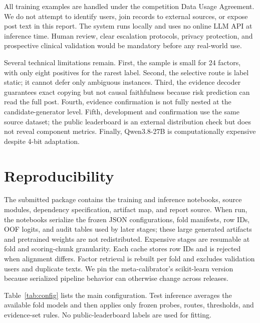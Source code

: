 \documentclass[conference]{IEEEtran}
\begin{document}
All training examples are handled under the competition Data Usage Agreement. We do not attempt to identify users, join records to external sources, or expose post text in this report. The system runs locally and uses no online LLM API at inference time. Human review, clear escalation protocols, privacy protection, and prospective clinical validation would be mandatory before any real-world use.

Several technical limitations remain. First, the sample is small for 24 factors, with only eight positives for the rarest label. Second, the selective route is label static; it cannot defer only ambiguous instances. Third, the evidence decoder guarantees exact copying but not causal faithfulness because risk prediction can read the full post. Fourth, evidence confirmation is not fully nested at the candidate-generator level. Fifth, development and confirmation use the same source dataset; the public leaderboard is an external distribution check but does not reveal component metrics. Finally, Qwen3.8-27B is computationally expensive despite 4-bit adaptation.

\section{Reproducibility}
The submitted package contains the training and inference notebooks, source modules, dependency specification, artifact map, and report source. When run, the notebooks serialize the frozen JSON configurations, fold manifests, row IDs, OOF logits, and audit tables used by later stages; these large generated artifacts and pretrained weights are not redistributed. Expensive stages are resumable at fold and scoring-chunk granularity. Each cache stores row IDs and is rejected when alignment differs. Factor retrieval is rebuilt per fold and excludes validation users and duplicate texts. We pin the meta-calibrator's scikit-learn version because serialized pipeline behavior can otherwise change across releases.

Table~\ref{tab:config} lists the main configuration. Test inference averages the available fold models and then applies only frozen probes, routes, thresholds, and evidence-set rules. No public-leaderboard labels are used for fitting.
\end{document}
